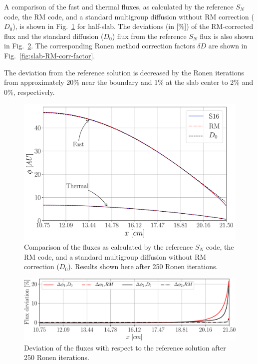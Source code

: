 A comparison of the fast and thermal fluxes, as calculated by the reference $S_N$ code, the RM code, and a standard multigroup diffusion without RM correction ($D_0$), is shown in Fig.~\ref{fig:slab-fluxes} for half-slab. The deviations (in [\%]) of the RM-corrected flux and the standard diffusion ($D_0$) flux from the reference $S_N$ flux is also shown in Fig.~\ref{fig:slab-fluxes-dev}. The corresponding Ronen method correction factors $\delta D$ are shown in Fig.~\ref{fig:slab-RM-corr-factor}. 

The deviation from the reference solution is decreased by the Ronen iterations from approximately 20\% near the boundary and 1\% at the slab center to 2\% and 0\%, respectively. 


\begin{figure}[!htbp]
	\centering
	\includegraphics[width=0.65\linewidth]{Sn_Diff_RM_Tomatis2011.pdf}
	\caption{Comparison of the fluxes as calculated by the reference $S_N$ code, the RM code, and a standard multigroup diffusion without RM correction ($D_0$). Results shown here after 250 Ronen iterations.}
	\label{fig:slab-fluxes}		
\end{figure}

\begin{figure}[!htbp]
	\centering
	\includegraphics[width=0.65\linewidth]{flx_err_Tomatis2011_400_250.pdf}
	\caption{Deviation of the fluxes with respect to the reference solution after 250 Ronen iterations.}
	\label{fig:slab-fluxes-dev}
\end{figure}

